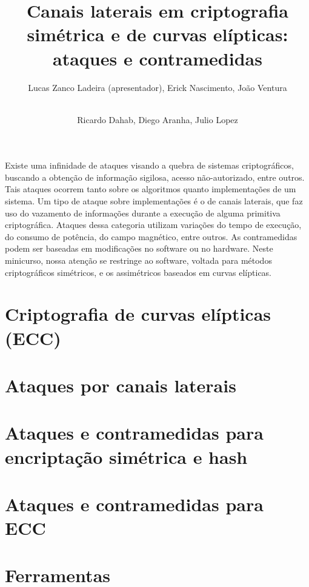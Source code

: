 \documentclass[12pt]{article}
\title{Canais laterais em criptografia simétrica e de curvas elípticas: ataques e contramedidas}
\author{Lucas Zanco Ladeira\inst{1} (apresentador), Erick Nascimento\inst{1}, Jo\~ao Ventura\inst{1}\and \\ Ricardo Dahab\inst{1}, Diego Aranha\inst{1}, Julio Lopez\inst{1}}
\begin{document}
 

\maketitle
     
\begin{resumo}
Existe uma infinidade de ataques visando a quebra de sistemas criptogr\'aficos, buscando a obtenção de informação sigilosa, acesso não-autorizado, entre outros. Tais ataques ocorrem tanto sobre os algoritmos quanto implementações de um sistema. Um tipo de ataque sobre implementações \'e o de canais laterais, que faz uso do vazamento de informa\c{c}\~oes durante a execu\c{c}\~ao de alguma primitiva criptogr\'afica. Ataques dessa categoria utilizam variações do tempo de execução, do consumo de pot\^encia, do campo magn\'etico, entre outros. As contramedidas podem ser baseadas em modificações no software ou no hardware. Neste minicurso, nossa atenção se restringe ao software, voltada para métodos criptográficos simétricos, e os assimétricos baseados em curvas elípticas.
\end{resumo}
\pagebreak



\pagebreak


\pagebreak

\section{Criptografia de curvas elípticas (ECC)}

\pagebreak

\section{Ataques por canais laterais}

\pagebreak

\section{Ataques e contramedidas para encriptação simétrica e hash}

\pagebreak

\section{Ataques e contramedidas para ECC}

\pagebreak


\pagebreak

\section{Ferramentas}
\end{document}
